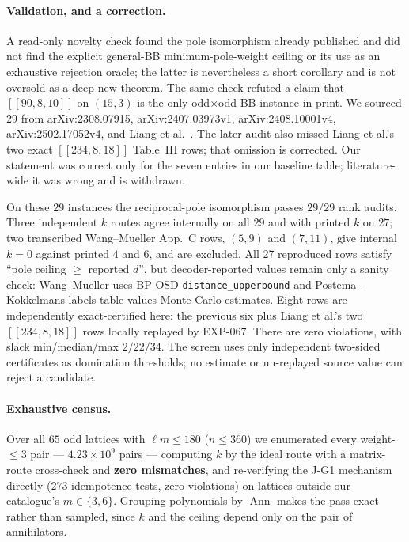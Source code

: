 \documentclass[11pt]{article}
\newcommand{\nk}[1]{[\![#1]\!]}
\theoremstyle{plain}
\theoremstyle{remark}
\begin{document}
\paragraph{Validation, and a correction.} A read-only novelty check found the
pole isomorphism already published and did not find the explicit general-BB
minimum-pole-weight ceiling or its use as an exhaustive rejection oracle; the
latter is nevertheless a short corollary and is not oversold as a deep new
theorem. The same check refuted a claim that $[[90,8,10]]$ on $(15,3)$ is the
only odd$\times$odd BB instance in print. We sourced $29$ from
arXiv:2308.07915, arXiv:2407.03973v1, arXiv:2408.10001v4,
arXiv:2502.17052v4, and Liang et al.~\cite{liang2025generalized}. The later
audit also missed Liang et al.'s two exact $\nk{234,8,18}$ Table~III rows;
that omission is corrected. Our statement was correct only for the seven
entries in our baseline table; literature-wide it was wrong and is withdrawn.

On these $29$ instances the reciprocal-pole isomorphism passes $29/29$ rank
audits. Three independent $k$ routes agree internally on all $29$ and with
printed $k$ on $27$; two transcribed Wang--Mueller App.~C rows, $(5,9)$ and
$(7,11)$, give internal $k=0$ against printed $4$ and $6$, and are excluded.
All 27 reproduced rows satisfy ``pole ceiling $\ge$ reported $d$'', but
decoder-reported values remain only a sanity check: Wang--Mueller uses BP-OSD
\texttt{distance\_upperbound} and Postema--Kokkelmans labels table values
Monte-Carlo estimates. Eight rows are independently exact-certified here: the
previous six plus Liang et al.'s two $\nk{234,8,18}$ rows locally replayed by
EXP-067. There are zero violations, with slack min/median/max $2/22/34$.
The screen uses only independent two-sided certificates as domination
thresholds; no estimate or un-replayed source value can reject a candidate.

\paragraph{Exhaustive census.} Over all $65$ odd lattices with $\ell m\le180$
($n\le360$) we enumerated every weight-$\le3$ pair --- $4.23\times10^{9}$ pairs
--- computing $k$ by the ideal route with a matrix-route cross-check and
\textbf{zero mismatches}, and re-verifying the J-G1 mechanism directly ($273$
idempotence tests, zero violations) on lattices outside our catalogue's
$m\in\{3,6\}$. Grouping polynomials by $\operatorname{Ann}$ makes the pass exact
rather than sampled, since $k$ and the ceiling depend only on the pair of
annihilators.
\end{document}
